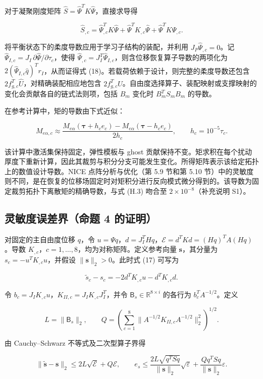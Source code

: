 \documentclass[preprint,12pt,authoryear]{elsarticle}
\begin{document}
对于凝聚刚度矩阵 \(\widehat S=\widehat\Psi^TK\widehat\Psi\)，直接求导得

\[
\widehat S_{,c}=\widehat\Psi_{,c}^TK\widehat\Psi+\widehat\Psi^TK_{,c}\widehat\Psi+\widehat\Psi^TK\widehat\Psi_{,c}.
\tag{H.2}
\]

将平衡状态下的柔度导数应用于学习子结构的装配，并利用 \(J_P\widehat\Psi_{,c}=0\)。记 \(\widehat\Psi_{I,c}=J_I\,\partial \widehat\Psi/\partial\tau_c\)，使得 \(\widehat\Psi_{,c}=J_I^T\widehat\Psi_{I,c}\)，则含位移恢复算子导数的两项化为 \(2(\widehat\Psi_{I,c}\widehat q)^Tr_I\)，从而证得式 (18)。若载荷依赖于设计，则完整的柔度导数还包含 \(2f_{g,c}^T\widehat U\)，对精确装配相应地包含 \(2f_{g,c}^TU\)。自由度选择算子、装配映射或支撑映射的变化会贡献各自的链式法则项，包括 \(B_m\) 变化时 \(B_m^TS_mB_m\) 的导数。

在参考计算中，矩的导数由下式近似：

\[
M_{e\alpha,c}\approx
\frac{M_{e\alpha}(\boldsymbol\tau+h_ce_c)-M_{e\alpha}(\boldsymbol\tau-h_ce_c)}{2h_c},
\qquad h_c=10^{-5}\tau_c.
\tag{H.3}
\]

该计算中激活集保持固定，弹性模板与 ghost 贡献保持不变。矩求积在每个扰动厚度下重新计算，因此其裁剪与积分分支可能发生变化。所得矩阵表示该给定拓扑上的数值设计导数。NICE 点阵分析与优化（第 5.9 节和第 5.10 节）中的灵敏度则不同，是在恢复的位移场固定时对矩积分进行反向模式微分得到的。该导数为固定裁剪拓扑下离散矩的精确导数，与式 (H.3) 吻合至 \(2\times10^{-8}\)（补充说明 S1）。

\subsection{灵敏度误差界（命题 4 的证明）}

对固定的主自由度位移 \(q\)，令 \(u=\Psi q\)，\(d=J_I^THq\)，\(\mathcal E=d^TKd=(Hq)^TA(Hq)\)。导数 \(K_{,c}\)，\(c=1,\ldots,8\)，均为对称矩阵。定义参考向量 \(\boldsymbol s\)，其分量为 \(s_c=-u^TK_{,c}u\)，并假设 \(\|\boldsymbol s\|_2>0\)。此时式 (17) 可写为

\[
\widetilde s_c-s_c=-2d^TK_{,c}u-d^TK_{,c}d.
\]

令 \(b_c=J_IK_{,c}u\)，\(K_{II,c}=J_IK_{,c}J_I^T\)，并令 \(\mathsf B_s\in\mathbb R^{8\times i}\) 的各行为 \(b_c^TA^{-1/2}\)。定义

\[
L=\|\mathsf B_s\|_2,\qquad
Q=\left(\sum_{c=1}^8\|A^{-1/2}K_{II,c}A^{-1/2}\|_2^2\right)^{1/2}.
\]

由 Cauchy--Schwarz 不等式及二次型算子界得

\[
\boxed{\|\widetilde{\boldsymbol s}-\boldsymbol s\|_2
\le2L\sqrt{\mathcal E}+Q\mathcal E,
\qquad e_s\le\frac{2L\sqrt{q^TSq}}{\|\boldsymbol s\|_2}\sqrt\varepsilon
+\frac{Qq^TSq}{\|\boldsymbol s\|_2}\varepsilon.}
\tag{H.4}
\]
\end{document}
